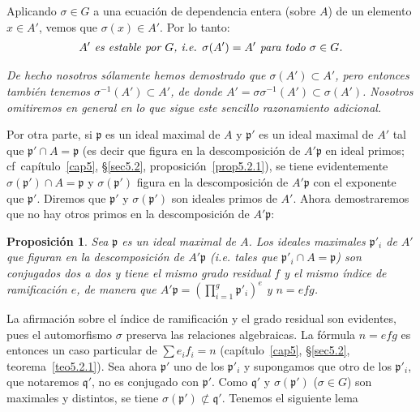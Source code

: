 \documentclass[bibtotoc,leqno,spanish]{amsbook}
\let\emph\relax %
\newcommand{\idl}[1]{\mathfrak{#1}}
\numberwithin{equation}{section}
\newenvironment{comm}%
	{\begin{list}{}{\setlength{\leftmargin}{2\parindent}\setlength{\topsep}{\baselineskip}}\item\itshape}
	{\end{list}}
\theoremstyle{note}
\theoremstyle{note}
\newtheorem{proposition}{Proposici\'on}
\theoremstyle{rem}
\numberwithin{theorem}{section}
\numberwithin{proposition}{section}
\numberwithin{definition}{section}
\numberwithin{lemma}{section}
\numberwithin{corollary}{section}
\numberwithin{example}{section}
\numberwithin{footnote}{section}%
\begin{document}
Aplicando $\sigma\in G$ a una ecuaci\'on de dependencia entera (sobre $A$) de un elemento $x\in A'$, vemos
que $\sigma(x)\in A'$. Por lo tanto:
\begin{gather}\label{eq6.2.1}
\text{\itshape $A'$ es estable por $G$, i.e. $\sigma(A')=A'$ para todo $\sigma\in G$.}
\end{gather}

\begin{comm}
De hecho nosotros s\'olamente hemos demostrado que $\sigma(A')\subset A'$, pero entonces tambi\'en
tenemos $\sigma^{-1}(A')\subset A'$, de donde $A'=\sigma\sigma^{-1}(A')\subset\sigma(A')$. Nosotros
omitiremos en general en lo que sigue este sencillo razonamiento adicional.
\end{comm}

Por otra parte, si $\idl{p}$ es un ideal maximal de $A$ y $\idl{p}'$ es un ideal maximal de $A'$ tal que
$\idl{p}'\cap A=\idl{p}$ (es decir que figura en la descomposici\'on de $A'\idl{p}$ en ideal primos;
cf~cap\'itulo~\ref{cap5}, \S\ref{sec5.2}, proposici\'on~\ref{prop5.2.1}),
se tiene evidentemente $\sigma(\idl{p}')\cap A=\idl{p}$ y
$\sigma(\idl{p}')$ figura en la descomposici\'on de $A'\idl{p}$ con el \emph{mismo} exponente que $\idl{p}'$.
Diremos que $\idl{p}'$ y $\sigma(\idl{p}')$ son ideales primos \emph{conjugados} de $A'$. Ahora demostraremos
que no hay otros primos en la descomposici\'on de $A'\idl{p}$:

\begin{proposition}\label{prop6.2.1}
Sea $\idl{p}$ es un ideal maximal de $A$. Los ideales maximales $\idl{p}'_{i}$ de $A'$ que figuran en
la descomposici\'on de $A'\idl{p}$ (i.e. tales que $\idl{p}'_{i}\cap A=\idl{p}$) son conjugados dos a dos
y tiene el mismo grado residual $f$ y el mismo \'indice de ramificaci\'on $e$, de manera que
$A'\idl{p} = \left(\prod_{i=1}^{g}\idl{p}'_{i}\right)^{e}$ y $n=efg$.
\end{proposition}

La afirmaci\'on sobre el \'indice de ramificaci\'on y el grado residual son evidentes, pues el automorfismo
$\sigma$ preserva \emph{todas} las relaciones algebraicas. La f\'ormula $n=efg$ es entonces un caso particular
de $\sum e_{i}f_{i}=n$ (cap\'itulo~\ref{cap5}, \S\ref{sec5.2}, teorema~\ref{teo5.2.1}). Sea ahora $\idl{p}'$ uno de los $\idl{p}'_{i}$
y supongamos que otro de los $\idl{p}'_{i}$, que notaremos $\idl{q}'$, no es conjugado con $\idl{p}'$.
Como $\idl{q}'$ y $\sigma(\idl{p}')$ ($\sigma\in G$) son maximales y distintos, se tiene $\sigma(\idl{p}')\not\subset\idl{q}'$.
Tenemos el siguiente lema
\end{document}
